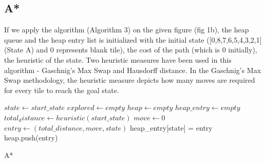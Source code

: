 \documentclass{svproc}
\begin{document}
\subsection{A*}
If we apply the algorithm (Algorithm 3)  on the given figure (fig 1b), the heap queue and the heap entry list is initialized with the initial state ([0,8,7,6,5,4,3,2,1] (State A) and 0 represents blank tile), the cost of the path (which is 0 initially), the heuristic of the state. Two heuristic measures have been used in this algorithm - Gaschnig’s Max Swap and Hausdorff distance. In the Gaschnig’s Max Swap methodology, the heuristic measure depicts how many moves are required for every tile to reach the goal state.
\setlength{\intextsep}{3pt}
\begin{algorithm}[H]
	\SetAlgoLined
	$state \gets start\_state$\;
	$explored \gets empty$\;
	$heap \gets empty$\;
	$heap\_entry \gets empty$\;
	$total_distance \gets heuristic(start\_state)$\;
	$move \gets 0$\;
	$entry \gets (total\_distance, move, state)$\;
	heap\_entry[state] = entry\;
	heap.push(entry)\;
	\caption{A*}
\end{algorithm}
\end{document}
